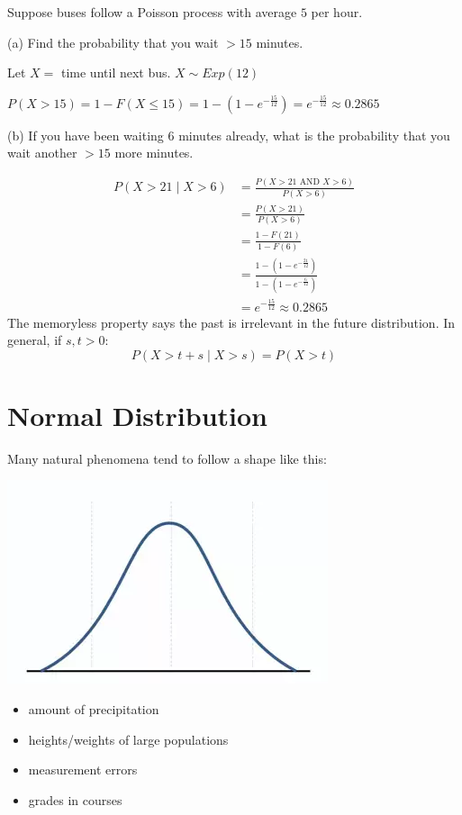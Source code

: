 Suppose buses follow a Poisson process with average $ 5 $ per hour.

(a) Find the probability that you wait $ >15 $ minutes.

Let $ X= $ time until next bus. $ X \sim Exp(12) $

$ P(X>15)=1-F(X\le 15)=1-\left(1-e^{-\frac{15}{12}}\right)= e^{-\frac{15}{12}}
    \approx 0.2865$

(b) If you have been waiting 6 minutes already, what is the probability
that you wait another $ >15 $ more minutes.

\begin{align*}
    P(X>21\mid X>6) & =\frac{P(X>21\text{ AND } X>6)}{P(X>6)}                   \\
                    & =\frac{P(X>21)}{P(X>6)}                                   \\
                    & =\frac{1-F(21)}{1-F(6)}                                   \\
                    & =\frac{1-(1-e^{-\frac{21}{12}})}{1-(1-e^{-\frac{6}{12}})} \\
                    & =e^{-\frac{15}{12}}\approx 0.2865
\end{align*}
The memoryless property says the past is irrelevant in the future distribution.
In general, if $ s,t>0 $:
\[ P(X>t+s\mid X>s)=P(X>t) \]

\setcounter{section}{4}
\section{Normal Distribution}
Many natural phenomena tend to follow a shape like this:

\begin{center}
    \includegraphics{gaussian.png}
\end{center}

\begin{itemize}
    \item amount of precipitation
    \item heights/weights of large populations
    \item measurement errors
    \item grades in courses
\end{itemize}

